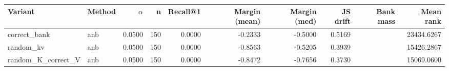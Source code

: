 \begin{tabular}{l l r r r r r r r r}
\toprule
Variant & Method & $\alpha$ & n & Recall@1 & Margin (mean) & Margin (med) & JS drift & Bank mass & Mean rank \\
\midrule
correct\_bank & anb & 0.0500 & 150 & 0.0000 & -0.2333 & -0.5000 & 0.5169 &  & 23434.6267 \\
random\_kv & anb & 0.0500 & 150 & 0.0000 & -0.8563 & -0.5205 & 0.3939 &  & 15426.2867 \\
random\_K\_correct\_V & anb & 0.0500 & 150 & 0.0000 & -0.8472 & -0.7656 & 0.3730 &  & 15069.0600 \\
\bottomrule
\end{tabular}
